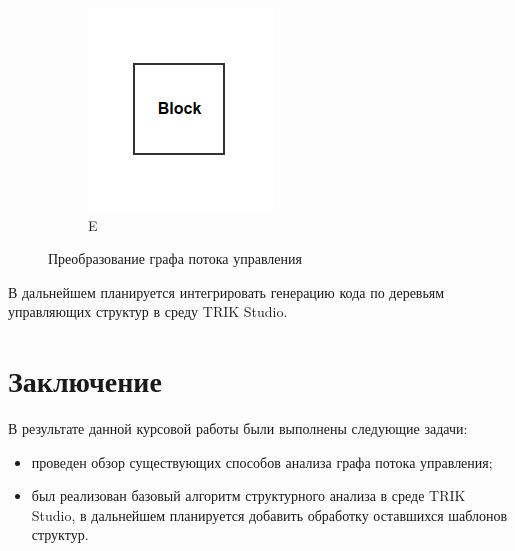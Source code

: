 \documentclass[14pt]{matmex-diploma}
\begin{document}
\begin{figure}
    \begin{subfigure}[b]{0.4\textwidth}
        \includegraphics[width=\textwidth]{images/blockScheme5.png}
        \caption{E}
        \label{fig:E}
    \end{subfigure}
    \caption{Преобразование графа потока управления}
\end{figure}


В дальнейшем планируется интегрировать генерацию кода по деревьям управляющих
структур в среду TRIK Studio.

\section*{Заключение}
В результате данной курсовой работы были выполнены следующие задачи:
\begin{itemize}
     \item проведен обзор существующих способов анализа графа потока управления;
     \item был реализован базовый алгоритм структурного анализа в среде TRIK Studio,
           в дальнейшем планируется добавить обработку оставшихся шаблонов структур.
\end{itemize}

\setmonofont[Mapping=tex-text]{CMU Typewriter Text}


\end{document}

